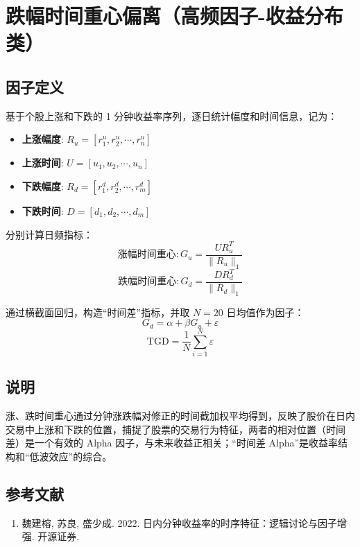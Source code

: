 \documentclass{article}
\begin{document}
\section{跌幅时间重心偏离（高频因子-收益分布类）}

\subsection{因子定义}
基于个股上涨和下跌的 1 分钟收益率序列，逐日统计幅度和时间信息，记为：
\begin{itemize}
    \item \textbf{上涨幅度}: \( R_u = [r_1^u, r_2^u, \cdots, r_n^u] \)
    \item \textbf{上涨时间}: \( U = [u_1, u_2, \cdots, u_n] \)
    \item \textbf{下跌幅度}: \( R_d = [r_1^d, r_2^d, \cdots, r_m^d] \)
    \item \textbf{下跌时间}: \( D = [d_1, d_2, \cdots, d_m] \)
\end{itemize}

分别计算日频指标：
\begin{equation}
    \text{涨幅时间重心}: G_u = \frac{U R_u^T}{\|R_u\|_1}
\end{equation}
\begin{equation}
    \text{跌幅时间重心}: G_d = \frac{D R_d^T}{\|R_d\|_1}
\end{equation}

通过横截面回归，构造“时间差”指标，并取 \( N=20 \) 日均值作为因子：
\begin{equation}
    G_d = \alpha + \beta G_u + \varepsilon
\end{equation}
\begin{equation}
    \mathrm{TGD} = \frac{1}{N} \sum_{i=1}^N \varepsilon
\end{equation}

\subsection{说明}
涨、跌时间重心通过分钟涨跌幅对修正的时间截加权平均得到，反映了股价在日内交易中上涨和下跌的位置，捕捉了股票的交易行为特征，两者的相对位置（时间差）是一个有效的 Alpha 因子，与未来收益正相关；“时间差 Alpha”是收益率结构和“低波效应”的综合。

\subsection{参考文献}
\begin{enumerate}
    \item 魏建榕, 苏良, 盛少成. 2022. 日内分钟收益率的时序特征：逻辑讨论与因子增强. 开源证券.
\end{enumerate}
\end{document}
